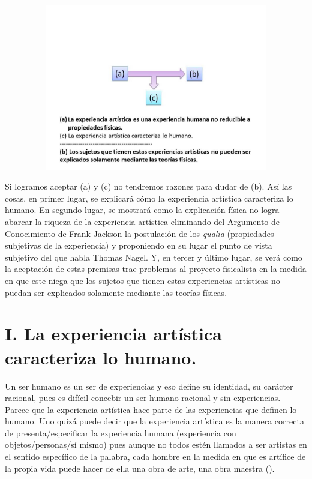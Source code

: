 \documentclass[]{book}
\begin{document}
\begin{refsection}
\begin{center}
	\includegraphics[width=5.76744in,height=2.86101in]{media/image2.png}

\end{center}

Si logramos aceptar (a) y (c) no tendremos razones para dudar de (b).
Así las cosas, en primer lugar, se explicará cómo la experiencia
artística caracteriza lo humano. En segundo lugar, se mostrará como la
explicación física no logra abarcar la riqueza de la experiencia
artística eliminando del Argumento de Conocimiento de Frank Jackson la
postulación de los \emph{qualia} (propiedades subjetivas de la
experiencia) y proponiendo en su lugar el punto de vista subjetivo del
que habla Thomas Nagel. Y, en tercer y último lugar, se verá como la
aceptación de estas premisas trae problemas al proyecto fisicalista en
la medida en que este niega que los sujetos que tienen estas
experiencias artísticas no puedan ser explicados solamente mediante las
teorías físicas.

\section*{I. La experiencia artística caracteriza lo humano.}

Un ser humano es un ser de experiencias y eso define su identidad, su
carácter racional, pues es difícil concebir un ser humano racional y sin
experiencias. Parece que la experiencia artística hace parte de las
experiencias que definen lo humano. Uno quizá puede decir que la
experiencia artística es la manera correcta de presenta/especificar la
experiencia humana (experiencia con objetos/personas/sí mismo) pues
aunque no todos estén llamados a ser artistas en el sentido específico
de la palabra, cada hombre en la medida en que es artífice de la propia
vida puede hacer de ella una obra de arte, una obra maestra (\cite{Juan1999}).


\end{refsection}
\end{document}
